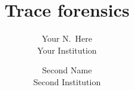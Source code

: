 \newcommand{\paa}[1]{{\textcolor{red}{[[#1 -- paa]]}}}
\newcommand{\kam}[1]{{\textcolor{blue}{[[#1 -- kam]]}}}
\newcommand{\ash}[1]{{\textcolor{violet}{[[#1 -- ash]]}}}



\date{}

\title{\Large \bf Trace forensics}

\author{
{\rm Your N.\ Here}\\
Your Institution
\and
{\rm Second Name}\\
Second Institution
} %

\maketitle

